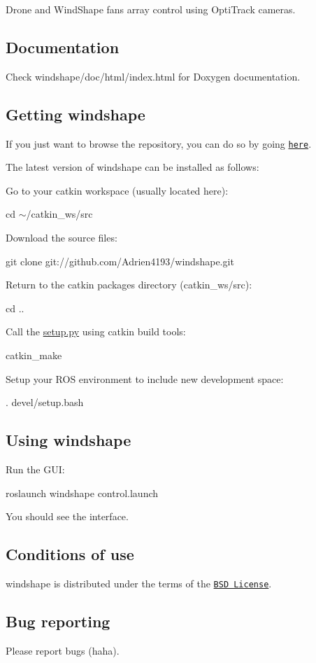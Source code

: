 Drone and Wind\+Shape fans array control using Opti\+Track cameras.

\subsection*{Documentation }

Check windshape/doc/html/index.\+html for Doxygen documentation.

\subsection*{Getting windshape }

If you just want to browse the repository, you can do so by going \href{https://github.com/Adrien4193/windshape}{\tt here}.

The latest version of windshape can be installed as follows\+:

Go to your catkin workspace (usually located here)\+:

{\ttfamily cd $\sim$/catkin\+\_\+ws/src}

Download the source files\+:

{\ttfamily git clone git\+://github.com/\+Adrien4193/windshape.\+git}

Return to the catkin packages directory (catkin\+\_\+ws/src)\+:

{\ttfamily cd ..}

Call the \mbox{\hyperlink{setup_8py}{setup.\+py}} using catkin build tools\+:

{\ttfamily catkin\+\_\+make}

Setup your R\+OS environment to include new development space\+:

{\ttfamily . devel/setup.\+bash}

\subsection*{Using windshape }

Run the G\+UI\+:

{\ttfamily roslaunch windshape control.\+launch}

You should see the interface.

\subsection*{Conditions of use }

windshape is distributed under the terms of the \href{https://github.com/}{\tt B\+SD License}.

\subsection*{Bug reporting }

Please report bugs (haha). 